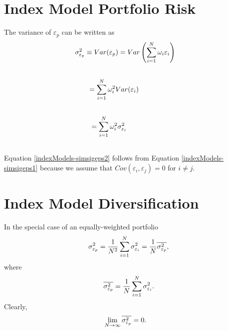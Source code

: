 \documentclass[letterpaper,10pt,english]{sphinxmanual}
\begin{document}
\section{Index Model Portfolio Risk}
\label{indexModels:id10}
The variance of $\varepsilon_p$ can be written as
\label{indexModels:equation-simsigeps1}\begin{gather}
\begin{split}\sigma^2_{\varepsilon_p} & \equiv Var(\varepsilon_p) =
        Var\left(\sum_{i=1}^N \omega_i \varepsilon_i \right)\end{split}\label{indexModels-simsigeps1}\\\begin{split}\end{split}\notag
\end{gather}\label{indexModels:equation-simsigeps2}\begin{gather}
\begin{split}& = \sum_{i=1}^N \omega^2_i Var(\varepsilon_i) \qquad \quad \enspace\end{split}\label{indexModels-simsigeps2}\\\begin{split}\end{split}\notag
\end{gather}\label{indexModels:equation-simsigeps3}\begin{gather}
\begin{split}& = \sum_{i=1}^N \omega^2_i \sigma^2_{\varepsilon_i} \qquad
        \qquad \quad\end{split}\label{indexModels-simsigeps3}\\\begin{split}\end{split}\notag
\end{gather}
Equation \eqref{indexModels-simsigeps2} follows from Equation \eqref{indexModels-simsigeps1}
because we assume that $Cov(\varepsilon_i, \varepsilon_j) = 0$ for $i
\neq j$.


\section{Index Model Diversification}
\label{indexModels:index-model-diversification}
In the special case of an equally-weighted portfolio
\begin{gather}
\begin{split}\sigma^2_{\varepsilon_p} = \frac{1}{N^2} \sum_{i=1}^N \sigma^2_{\varepsilon_i} = \frac{1}{N} \overline{\sigma^2_{\varepsilon_p}},\end{split}\notag
\end{gather}
where
\begin{gather}
\begin{split}\overline{\sigma^2_{\varepsilon_p}} = \frac{1}{N} \sum_{i=1}^N \sigma^2_{\varepsilon_i}.\end{split}\notag
\end{gather}
Clearly,
\begin{gather}
\begin{split}\lim_{N \to \infty} \overline{\sigma^2_{\varepsilon_p}} & = 0.\end{split}\notag
\end{gather}
\end{document}
